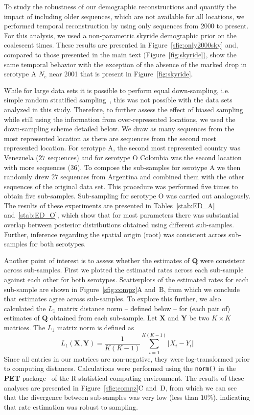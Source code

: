 \documentclass[a4paper,10pt]{article}
\begin{document}
To study the robustness of our demographic reconstructions and quantify the impact of including older sequences, which are not available for all locations, we performed temporal reconstruction by using only sequences from $2000$ to present.
For this analysis, we used a non-parametric skyride demographic prior \cite{M-skyride} on the coalescent times.
These results are presented in Figure~\ref{sfig:only2000sky} and, compared to those presented in the main text (Figure~\ref{fig:skyride}), show the same temporal behavior with the exception of the absence of the marked drop in serotype A $N_e$ near 2001 that is present in Figure~\ref{fig:skyride}.

While for large data sets it is possible to perform equal down-sampling, i.e. simple random stratified sampling~\cite{M-fluPNAS}, this was not possible with the data sets analyzed in this study. 
Therefore, to further assess the effect of biased sampling while still using the information from over-represented locations, we used the down-sampling scheme detailed below.
We draw as many sequences from the most represented location as there are sequences from the second most represented location.
For serotype A, the second most represented country was Venezuela ($27$ sequences) and for serotype O Colombia was the second location with more sequences ($36$).
To compose the sub-samples for serotype A we then randomly drew $27$ sequences from Argentina and combined them with the other sequences of the original data set.
This procedure was performed five times to obtain five sub-samples.
Sub-sampling for serotype O was carried out analogously.
The results of these experiments are presented in Tables~\ref{stab:ED_A} and~\ref{stab:ED_O}, which show that for most parameters there was substantial overlap between posterior distributions obtained using different sub-samples.
Further, inference regarding the spatial origin (root) was consistent across sub-samples for both serotypes.

Another point of interest is to assess whether the estimates of $\mathbf{Q}$ were consistent across sub-samples.
First we plotted the estimated rates across each sub-sample against each other for both serotypes.
Scatterplots of the estimated rates for each sub-sample are shown in Figure~\ref{sfig:compz}A and~B, from which we conclude that estimates agree across sub-samples.
To explore this further, we also calculated the $L_1$ matrix distance norm -- defined below -- for (each pair of) estimates of $\mathbf{Q}$ obtained from each sub-sample.
Let $\mathbf{X}$ and $\mathbf{Y}$ be two $K \times K$ matrices.
The $L_1$ matrix norm is defined as
\begin{equation}
\label{seq:L1}
 L_1 (\mathbf{X}, \mathbf{Y}) = \frac{1}{K(K-1)} \sum_{i=1}^{K(K-1)} |X_i-Y_i|  
\end{equation}
Since all entries in our matrices are non-negative, they were log-transformed prior to computing distances.
Calculations were performed using the \verb|norm()| in the \textbf{PET} package~\cite{PET} of the R statistical computing environment.
The results of these analyses are presented in Figure~\ref{sfig:compz}C and~D, from which we can see that the divergence between sub-samples was very low (less than $10\%$), indicating that rate estimation was robust to sampling.
\end{document}
